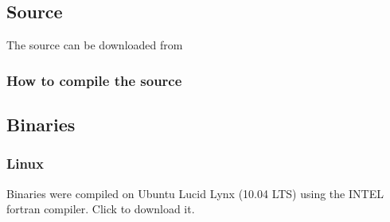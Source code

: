          \subsection{Source}

         The source can be downloaded from  

         \subsubsection{How to compile the source} 

         \subsection{Binaries}

                    \subsubsection{Linux}
                    
                    Binaries were compiled on Ubuntu Lucid Lynx (10.04 LTS) using the INTEL fortran compiler.
                    Click  to download it.

%
